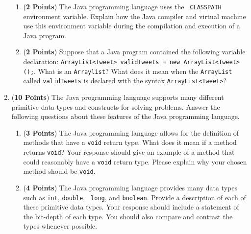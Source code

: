 \documentclass[12pt]{article}
\begin{document}
\begin{enumerate}
\begin{enumerate}

 \item ({\bf 2 Points}) The Java programming language uses the {\tt
   CLASSPATH} environment variable.  Explain how the Java compiler and
   virtual machine use this environment variable during the compilation
   and execution of a Java program.

\item ({\bf 2 Points}) Suppose that a Java program contained the
  following variable declaration: {\tt ArrayList<Tweet> validTweets =
    new ArrayList<Tweet>();}.  What is an {\tt Arraylist}?  What does
  it mean when the {\tt ArrayList} called {\tt validTweets} is
  declared with the syntax {\tt ArrayList<Tweet>}?

\end{enumerate}

\newpage

\item ({\bf 10 Points}) The Java programming language supports many different primitive data types and constructs for
  solving problems.  Answer the following questions about these features of the Java programming language.

\begin{enumerate}

\item ({\bf 3 Points}) The Java programming language allows for the definition of methods that have a {\tt void} return
  type.  What does it mean if a method returns {\tt void}?  Your response should give an example of a method that could
  reasonably have a {\tt void} return type.  Please explain why your chosen method should be {\tt void}.

  
\item ({\bf 4 Points}) The Java programming language provides many data types such as {\tt int}, {\tt double}, {\tt
  long}, and {\tt boolean}.  Provide a description of each of these primitive data types.  Your response should include
  a statement of the bit-depth of each type. You should also compare and contrast the types whenever possible.
  


\end{enumerate}
\end{enumerate}
\end{document}
